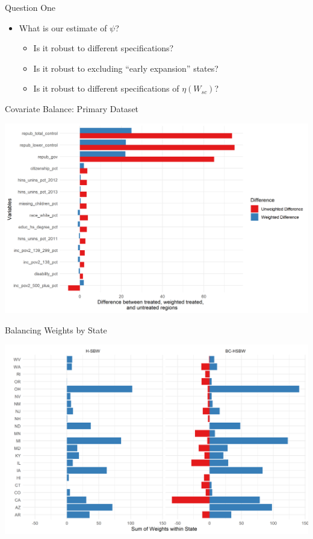 \documentclass[hyperref={pdfpagelabels=false}]{beamer}
\begin{document}
\begin{frame}{Question One}
    \begin{itemize}
        \item What is our estimate of $\psi$? \bigskip
        \begin{itemize}
            \item Is it robust to different specifications? \bigskip
            \item Is it robust to excluding ``early expansion'' states? \bigskip
            \item Is it robust to different specifications of $\eta(W_{sc})$? \bigskip
        \end{itemize}
    \end{itemize}
\end{frame}

\begin{frame}{Covariate Balance: Primary Dataset}
    \begin{center}
	\includegraphics[scale=0.5]{01_Plots/balance-plot-etuc1.png}
    \end{center}
\end{frame}

\begin{frame}{Balancing Weights by State}
    \begin{center}
	\includegraphics[scale=0.5]{01_Plots/weights-by-state-hsbw-c1.png}
    \end{center}
\end{frame}
\end{document}
